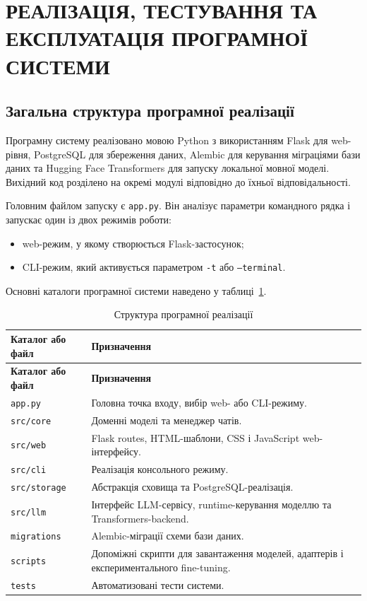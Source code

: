 \section{РЕАЛІЗАЦІЯ, ТЕСТУВАННЯ ТА ЕКСПЛУАТАЦІЯ ПРОГРАМНОЇ СИСТЕМИ}

\subsection{Загальна структура програмної реалізації}

Програмну систему реалізовано мовою Python з використанням Flask для web-рівня, PostgreSQL для збереження даних, Alembic для керування міграціями бази даних та Hugging Face Transformers для запуску локальної мовної моделі. Вихідний код розділено на окремі модулі відповідно до їхньої відповідальності.

Головним файлом запуску є \texttt{app.py}. Він аналізує параметри командного рядка і запускає один із двох режимів роботи:
\begin{itemize}
  \item web-режим, у якому створюється Flask-застосунок;
  \item CLI-режим, який активується параметром \texttt{-t} або \texttt{--terminal}.
\end{itemize}

Основні каталоги програмної системи наведено у таблиці~\ref{tab:project-structure}.

\small
\begin{longtable}{|p{4.2cm}|p{10.2cm}|}
\caption{Структура програмної реалізації}
\label{tab:project-structure}\\
\hline
\textbf{Каталог або файл} & \textbf{Призначення} \\
\hline
\endfirsthead
\hline
\textbf{Каталог або файл} & \textbf{Призначення} \\
\hline
\endhead
\texttt{app.py} & Головна точка входу, вибір web- або CLI-режиму. \\
\hline
\texttt{src/core} & Доменні моделі та менеджер чатів. \\
\hline
\texttt{src/web} & Flask routes, HTML-шаблони, CSS і JavaScript web-інтерфейсу. \\
\hline
\texttt{src/cli} & Реалізація консольного режиму. \\
\hline
\texttt{src/storage} & Абстракція сховища та PostgreSQL-реалізація. \\
\hline
\texttt{src/llm} & Інтерфейс LLM-сервісу, runtime-керування моделлю та Transformers-backend. \\
\hline
\texttt{migrations} & Alembic-міграції схеми бази даних. \\
\hline
\texttt{scripts} & Допоміжні скрипти для завантаження моделей, адаптерів і експериментального fine-tuning. \\
\hline
\texttt{tests} & Автоматизовані тести системи. \\
\hline
\end{longtable}
\normalsize

